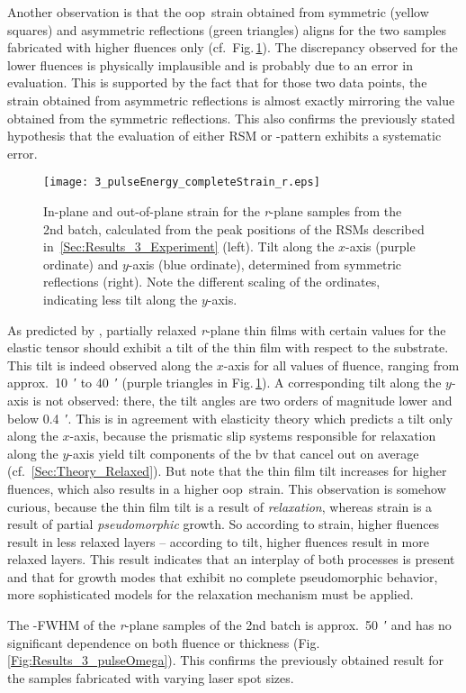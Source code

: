 {\sloppy %
Another observation is that the \gls{oop}\ strain obtained from symmetric (yellow squares) and asymmetric reflections (green triangles) aligns for the two samples fabricated with higher fluences only (cf.\ Fig.\,\ref{Fig:Results_3_pulse_r_StrainTilt}).
The discrepancy observed for the lower fluences is physically implausible and is probably due to an error in evaluation.
This is supported by the fact that for those two data points, the strain obtained from asymmetric reflections is almost exactly mirroring the value obtained from the symmetric reflections.
This also confirms the previously stated hypothesis that the evaluation of either \gls{RSM} or \thetaomega-pattern exhibits a systematic error.
\par}
\begin{figure}
    \centering
    \texttt{[image: 3\_pulseEnergy\_completeStrain\_r.eps]}
    \caption{
        In-plane and out-of-plane strain for the \textit{r}-plane samples from the 2nd batch, calculated from the peak positions of the \glspl{RSM} described in~\ref{Sec:Results_3_Experiment} (left).
        Tilt along the $x$-axis (purple ordinate) and $y$-axis (blue ordinate), determined from symmetric reflections (right).
        Note the different scaling of the ordinates, indicating less tilt along the $y$-axis.
    }
    \label{Fig:Results_3_pulse_r_StrainTilt}
\end{figure}

As predicted by \textcite{grundmann2020b}, partially relaxed \textit{r}-plane thin films with certain values for the elastic tensor should exhibit a tilt of the thin film with respect to the substrate.
This tilt is indeed observed along the $x$-axis for all values of fluence, ranging from approx.\ \qty{10}{\arcminute} to \qty{40}{\arcminute} (purple triangles in Fig.\,\ref{Fig:Results_3_pulse_r_StrainTilt}).
A corresponding tilt along the $y$-axis is not observed: there, the tilt angles are two orders of magnitude lower and below \qty{0.4}{\arcminute}.
This is in agreement with elasticity theory which predicts a tilt only along the $x$-axis, because the prismatic slip systems responsible for relaxation along the $y$-axis yield tilt components of the \gls{bv} that cancel out on average (cf.~\ref{Sec:Theory_Relaxed}).
But note that the thin film tilt increases for higher fluences, which also results in a higher \gls{oop}\ strain.
This observation is somehow curious, because the thin film tilt is a result of \emph{relaxation}, whereas strain is a result of partial \emph{pseudomorphic} growth.
So according to strain, higher fluences result in less relaxed layers -- according to tilt, higher fluences result in more relaxed layers.
This result indicates that an interplay of both processes is present and that for growth modes that exhibit no complete pseudomorphic behavior, more sophisticated models for the relaxation mechanism must be applied.

The \textomega-FWHM of the \textit{r}-plane samples of the 2nd batch is approx.\ \qty{50}{\arcminute} and has no significant dependence on both fluence or thickness (Fig.\,\ref{Fig:Results_3_pulseOmega}).
This confirms the previously obtained result for the samples fabricated with varying laser spot sizes.